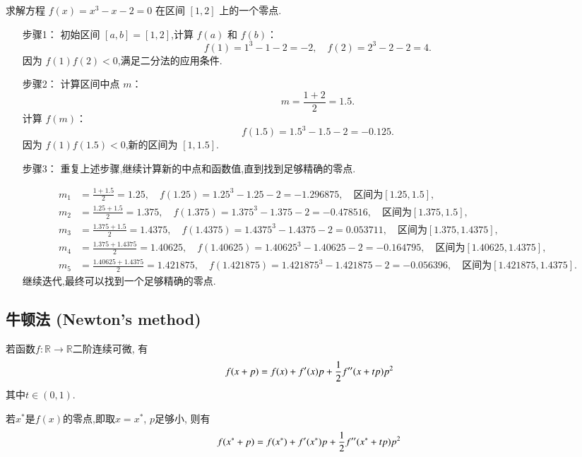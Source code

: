 \begin{example}
    求解方程 $f(x) = x^3 - x - 2 = 0$ 在区间 $[1, 2]$ 上的一个零点.
\begin{solution}
\begin{enumerate}
    \item[步骤1：] 初始区间 $[a, b] = [1, 2]$,计算 $f(a)$ 和 $f(b)$：
    \[
    f(1) = 1^3 - 1 - 2 = -2, \quad f(2) = 2^3 - 2 - 2 = 4.
    \]
    因为 $f(1)f(2) < 0$,满足二分法的应用条件.
    \item[步骤2：] 计算区间中点 $m$：
    \[
    m = \frac{1 + 2}{2} = 1.5.
    \]
    计算 $f(m)$：
    \[
    f(1.5) = 1.5^3 - 1.5 - 2 = -0.125.
    \]
    因为 $f(1)f(1.5) < 0$,新的区间为 $[1, 1.5]$.
    \item[步骤3：] 重复上述步骤,继续计算新的中点和函数值,直到找到足够精确的零点.

    \[
    \begin{aligned}
    m_1 &= \frac{1 + 1.5}{2} = 1.25, \quad f(1.25) = 1.25^3 - 1.25 - 2 = -1.296875, \quad \text{区间为} [1.25, 1.5], \\
    m_2 &= \frac{1.25 + 1.5}{2} = 1.375, \quad f(1.375) = 1.375^3 - 1.375 - 2 = -0.478516, \quad \text{区间为} [1.375, 1.5], \\
    m_3 &= \frac{1.375 + 1.5}{2} = 1.4375, \quad f(1.4375) = 1.4375^3 - 1.4375 - 2 = 0.053711, \quad \text{区间为} [1.375, 1.4375], \\
    m_4 &= \frac{1.375 + 1.4375}{2} = 1.40625, \quad f(1.40625) = 1.40625^3 - 1.40625 - 2 = -0.164795, \quad \text{区间为} [1.40625, 1.4375], \\
    m_5 &= \frac{1.40625 + 1.4375}{2} = 1.421875, \quad f(1.421875) = 1.421875^3 - 1.421875 - 2 = -0.056396, \quad \text{区间为} [1.421875, 1.4375].
    \end{aligned}
    \]
    继续迭代,最终可以找到一个足够精确的零点.
\end{enumerate}
\end{solution}

\end{example}

\subsection{牛顿法 (Newton's method)}
\label{sub:newton_method}

\begin{theorem}
    若函数$f:\mathbb{R} \to \mathbb{R}$二阶连续可微,
    有
    \begin{equation}
        f(x+p) = f(x) + f'(x) p + {\frac{1}{2}} f''(x + t p) p^2
    \end{equation}
    其中$t\in (0,1)$.
\end{theorem}
若$x^*$是$f(x)$的零点,即取$x=x^*$, $p$足够小, 则有
$$
f(x^*+p) = f(x^*) + f'(x^*) p + {\frac{1}{2}} f''(x^* + t p) p^2
$$



